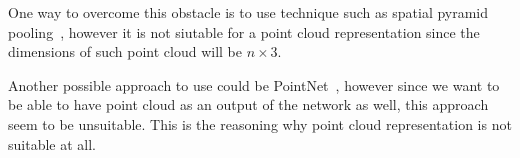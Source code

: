 One way to overcome this obstacle is to use technique such as spatial pyramid pooling~\cite{spatialpool}, however it is not siutable for a point cloud representation since the dimensions of such point cloud will be $n\times3$.

Another possible approach to use could be PointNet~\cite{pointnet}, however since we want to be able to have point cloud as an output of the network as well, this approach seem to be unsuitable. This is the reasoning why point cloud representation is not suitable at all.
